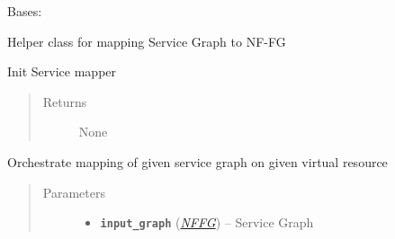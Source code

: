 \documentclass[letterpaper,10pt,english]{sphinxmanual}
\begin{document}
\begin{fulllineitems}
\label{service/sas_mapping:escape.service.sas_mapping.ServiceGraphMapper}
Bases: {\hyperref[util/mapping:escape.util.mapping.AbstractMapper]{\emph{}}}

Helper class for mapping Service Graph to NF-FG

\begin{fulllineitems}
\label{service/sas_mapping:escape.service.sas_mapping.ServiceGraphMapper._eventMixin_events}
\end{fulllineitems}


\begin{fulllineitems}
\label{service/sas_mapping:escape.service.sas_mapping.ServiceGraphMapper.__init__}
Init Service mapper
\begin{quote}\begin{description}
\item[{Returns}] \leavevmode
None

\end{description}\end{quote}

\end{fulllineitems}


\begin{fulllineitems}
\label{service/sas_mapping:escape.service.sas_mapping.ServiceGraphMapper.orchestrate}
Orchestrate mapping of given service graph on given virtual resource
\begin{quote}\begin{description}
\item[{Parameters}] \leavevmode\begin{itemize}
\item {} 
\textbf{\texttt{input\_graph}} ({\hyperref[util/nffg:escape.util.nffg.NFFG]{\emph{\emph{NFFG}}}}) -- Service Graph


\end{itemize}
\end{description}
\end{quote}
\end{fulllineitems}
\end{fulllineitems}
\end{document}
